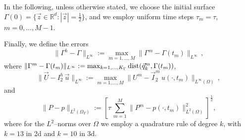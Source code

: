 \documentclass[a4paper,12pt,onecolumn]{article}
\newcommand{\R}{{\mathbb R}}
\newcommand{\errorXx}{\|\Gamma^h - \Gamma\|_{L^\infty}}
\newcommand{\errorUu}[1]{\|\vec U - I^h_{#1}\,\vec u\|_{L^\infty}}
\newcommand{\LerrorPp}{\|P - p\|_{L^2(\Omega_T)}}
\begin{document}
In the following, unless otherwise stated, we choose the initial surface
$\Gamma(0) = \{ \vec z \in \R^d : |\vec z| = \frac12 \}$, and we employ
uniform time steps $\tau_m=\tau$, $m=0,\ldots, M-1$.

Finally, we define the errors
\begin{equation} \label{eq:errorXx}
\errorXx := \max_{m=1,\ldots, M} \|\Gamma^m - \Gamma(t_m)\|_{L^\infty}\,,
\end{equation}
where $\|\Gamma^m - \Gamma(t_m)\|_{L^\infty} :=
\max_{k=1,\ldots, K_\Gamma} {\rm dist}( \vec{q}^m_k, \Gamma(t_m))$,
\begin{equation*}
\errorUu2 := \max_{m=1,\ldots, M}\|U^m
- \vec I^m_2\,u(\cdot,t_m)\|_{L^\infty(\Omega)}\,,
\end{equation*}
and
\begin{equation*}
\LerrorPp := \left[\tau\,\sum_{m=1}^M \|P^m - p(\cdot,t_m)\|_{L^2(\Omega)}^2
\right]^\frac12 ,
\end{equation*}
where for the $L^2$--norms over $\Omega$ we employ a quadrature rule of degree
$k$, with $k=13$ in 2d and $k=10$ in 3d.
\end{document}
